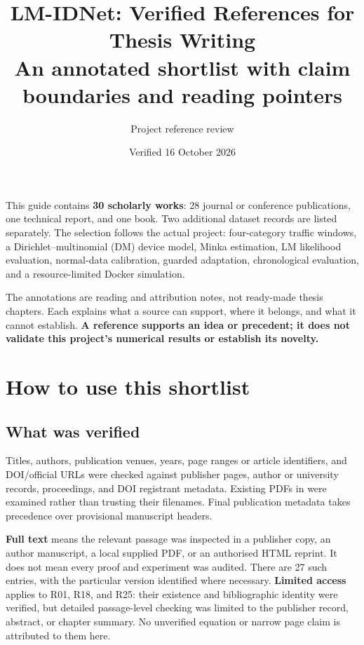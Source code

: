 \documentclass[11pt,a4paper]{article}
\title{LM-IDNet: Verified References for Thesis Writing\\
  \large An annotated shortlist with claim boundaries and reading pointers}
\author{Project reference review}
\date{Verified 16 October 2026}
\begin{document}
\maketitle

This guide contains \textbf{30 scholarly works}: 28 journal or conference
publications, one technical report, and one book. Two additional dataset records
are listed separately. The selection follows the actual project: four-category
traffic windows, a Dirichlet--multinomial (DM) device model, Minka estimation,
LM likelihood evaluation, normal-data calibration, guarded adaptation,
chronological evaluation, and a resource-limited Docker simulation.

The annotations are reading and attribution notes, not ready-made thesis
chapters. Each explains what a source can support, where it belongs, and what
it cannot establish. \textbf{A reference supports an idea or precedent; it does
not validate this project's numerical results or establish its novelty.}

\tableofcontents
\clearpage

\section{How to use this shortlist}

\subsection{What was verified}

Titles, authors, publication venues, years, page ranges or article identifiers,
and DOI/official URLs were checked against publisher pages, author or university
records, proceedings, and DOI registrant metadata. Existing PDFs in
 were examined rather than trusting their filenames. Final
publication metadata takes precedence over provisional manuscript headers.

\textbf{Full text} means the relevant passage was inspected in a publisher
copy, an author manuscript, a local supplied PDF, or an authorised HTML reprint.
It does not mean every proof and experiment was audited. There are 27 such
entries, with the particular version identified where necessary.
\textbf{Limited access} applies to R01, R18, and R25: their existence and
bibliographic identity were verified, but detailed passage-level checking was
limited to the publisher record, abstract, or chapter summary. No unverified
equation or narrow page claim is attributed to them here.
\end{document}
